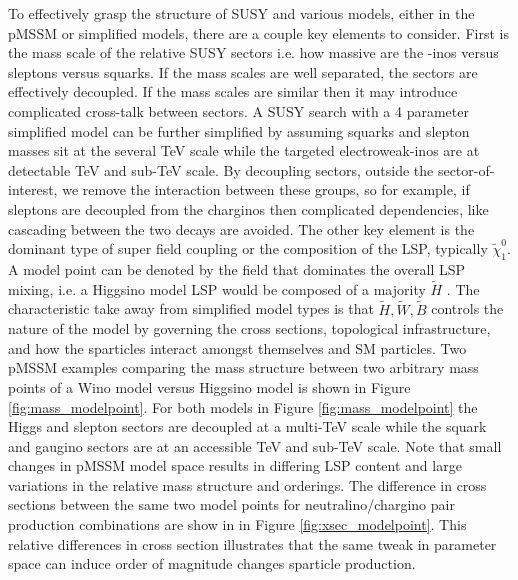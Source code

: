 To effectively grasp the structure of SUSY and various models, either in the pMSSM or simplified models, there are a couple key elements to consider. First is the mass scale of the relative SUSY sectors i.e. how massive are the -inos versus sleptons versus squarks. If the mass scales are well separated, the sectors are effectively decoupled. If the mass scales are similar then it may introduce complicated cross-talk between sectors. A SUSY search with a 4 parameter simplified model can be further simplified by assuming squarks and slepton masses sit at the several TeV scale while the targeted electroweak-inos are at detectable TeV and sub-TeV scale.  By decoupling sectors, outside the sector-of-interest, we remove the interaction between these groups, so for example, if sleptons are decoupled from the charginos then complicated dependencies, like cascading between the two decays are avoided. The other key element is the dominant type of super field coupling or the composition of the LSP, typically $\tilde{\chi}^0_1$.  A model point can be denoted by the field that dominates the overall LSP mixing, i.e. a Higgsino model LSP would be composed of a majority $\tilde{H}$ \cite{ATLAS:2015wrn}. The characteristic take away from simplified model types is that $\tilde{H},\tilde{W},\tilde{B}$ controls the nature of the model by governing the cross sections, topological infrastructure, and how the sparticles interact amongst themselves and SM particles. Two pMSSM examples comparing the mass structure between two arbitrary mass points of a Wino model versus Higgsino model is shown in Figure \ref{fig:mass_modelpoint}. For both models in Figure \ref{fig:mass_modelpoint} the Higgs and slepton sectors are decoupled at a multi-TeV scale while the squark and gaugino sectors are at an accessible TeV and sub-TeV scale. Note that small changes in pMSSM model space results in differing LSP content and large variations in the relative mass structure and orderings. The difference in cross sections between the same two model points for neutralino/chargino pair production combinations are show in in Figure \ref{fig:xsec_modelpoint}. This relative differences in cross section illustrates that the same tweak in parameter space can induce order of magnitude changes sparticle production.



